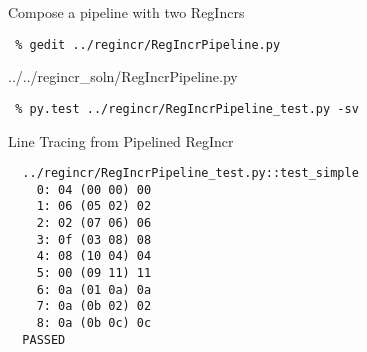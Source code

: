 \begin{task}\begin{frame}[fragile]{Compose a pipeline with two RegIncrs}

\vspace{-0.15in}
\begin{Verbatim}[commandchars=\\\{\}]
 % cd    \midtilde/pymtl-tut/build
 % gedit ../regincr/RegIncrPipeline.py
\end{Verbatim}
\vspace{-0.2in}

%
{../../regincr_soln/RegIncrPipeline.py}

\vspace{-0.22in}
\begin{Verbatim}
 % py.test ../regincr/RegIncrPipeline_test.py -sv
\end{Verbatim}

\vspace{-2.35in}\hspace*{2.5in}

\end{frame}
\end{task}

\begin{frame}[fragile]{Line Tracing from Pipelined RegIncr}

\begin{Verbatim}
  ../regincr/RegIncrPipeline_test.py::test_simple
    0: 04 (00 00) 00
    1: 06 (05 02) 02
    2: 02 (07 06) 06
    3: 0f (03 08) 08
    4: 08 (10 04) 04
    5: 00 (09 11) 11
    6: 0a (01 0a) 0a
    7: 0a (0b 02) 02
    8: 0a (0b 0c) 0c
  PASSED
\end{Verbatim}

\end{frame}

